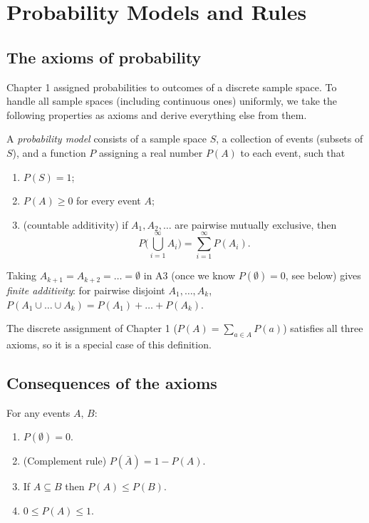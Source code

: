 \chapter{Probability Models and Rules}

\section{The axioms of probability}

Chapter 1 assigned probabilities to outcomes of a discrete sample space. To handle all
sample spaces (including continuous ones) uniformly, we take the following properties as
axioms and derive everything else from them.

\begin{definition}
A \emph{probability model} consists of a sample space $S$, a collection of events
(subsets of $S$), and a function $P$ assigning a real number $P(A)$ to each event, such
that
\begin{enumerate}
  \item[\textbf{A1.}] $P(S) = 1$;
  \item[\textbf{A2.}] $P(A) \ge 0$ for every event $A$;
  \item[\textbf{A3.}] (countable additivity) if $A_1, A_2, \dots$ are pairwise mutually
        exclusive, then
        \[
          P\Big(\bigcup_{i=1}^\infty A_i\Big) = \sum_{i=1}^\infty P(A_i).
        \]
\end{enumerate}
\end{definition}

Taking $A_{k+1} = A_{k+2} = \dots = \emptyset$ in A3 (once we know $P(\emptyset)=0$, see
below) gives \emph{finite additivity}: for pairwise disjoint $A_1,\dots,A_k$,
$P(A_1 \cup \dots \cup A_k) = P(A_1) + \dots + P(A_k)$.

\begin{remark}
The discrete assignment of Chapter 1 ($P(A) = \sum_{a\in A} P(a)$) satisfies all three
axioms, so it is a special case of this definition.
\end{remark}

\section{Consequences of the axioms}

\begin{theorem}
For any events $A$, $B$:
\begin{enumerate}
  \item $P(\emptyset) = 0$.
  \item (Complement rule) $P(\bar A) = 1 - P(A)$.
  \item If $A \subseteq B$ then $P(A) \le P(B)$.
  \item $0 \le P(A) \le 1$.
\end{enumerate}
\end{theorem}

